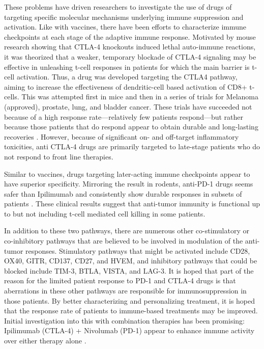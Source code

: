 These problems have driven researchers to investigate the use of drugs of targeting specific molecular mechanisms underlying immune suppression and activation. 
Like with vaccines, there have been efforts to characterize immune checkpoints at each stage of the adaptive immune response. 
Motivated by mouse research showing that CTLA-4 knockouts induced lethal auto-immune reactions, it was theorized that a weaker, temporary blockade of CTLA-4 signaling may be effective in unleashing t-cell responses in patients for which the main barrier is t-cell activation. 
Thus, a drug was developed targeting the CTLA4 pathway, aiming to increase the effectiveness of dendritic-cell based activation of CD8+ t-cells. 
This was attempted first in mice and then in a series of trials for Melanoma (approved), prostate, lung, and bladder cancer. %
These trials have succeeded not because of a high response rate---relatively few patients respond---but rather because those patients that do respond appear to obtain durable and long-lasting recoveries \citep{Robert2011,Hodi2010}.
However, because of significant on- and off-target inflammatory toxicities, anti CTLA-4 drugs are primarily targeted to late-stage patients who do not respond to front line therapies. 

Similar to vaccines, drugs targeting later-acting immune checkpoints appear to have superior specificity. 
Mirroring the result in rodents, anti-PD-1 drugs seems safer than Ipilimumab \citep{Brahmer2010} and consistently show durable responses in subsets of patients \citep{Hamid2013,McDermott2014}. 
These clinical results suggest that anti-tumor immunity is functional up to but not including t-cell mediated cell killing in some patients. %

In addition to these two pathways, there are numerous other co-stimulatory or co-inhibitory pathways that are believed to be involved in modulation of the anti-tumor responses. 
Stimulatory pathways that might be activated include CD28, OX40, GITR, CD137, CD27, and HVEM, and inhibitory pathways that could be blocked include TIM-3, BTLA, VISTA, and LAG-3. 
It is hoped that part of the reason for the limited patient response to PD-1 and CTLA-4 drugs is that aberrations in these other pathways are responsible for immunosuppression in those patients. 
By better characterizing and personalizing treatment, it is hoped that the response rate of patients to immune-based treatments may be improved. 
Initial investigation into this with combination therapies has been promising: Ipilimumab (CTLA-4) + Nivolumab (PD-1) appear to enhance immune activity over either therapy alone \citep{Wolchok2013}.

